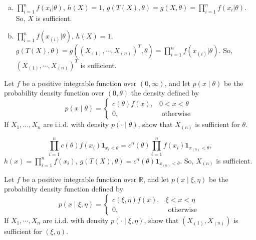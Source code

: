 \begin{solution}
    \begin{enumerate}[(a)]
        \item $\prod_{i=1}^nf(x_i|\theta)$, $h(X)=1$, $g(T(X), \theta)=g(X,\theta)=\prod_{i=1}^nf(x_i|\theta)$. So, $X$ is sufficient. 
        \item $\prod_{i=1}^nf(x_{(i)}|\theta)$, $h(X)=1$, $g(T(X), \theta)=g((X_{(1)}, \cdots,X_{(n)})^T,\theta)=\prod_{i=1}^nf(x_{(i)}|\theta)$. So, $(X_{(1)}, \cdots,X_{(n)})^T$ is sufficient. 
    \end{enumerate}
\end{solution}

\begin{exercise}
    Let \(f\) be a positive integrable function over \((0, \infty)\), and let \(p(x \mid \theta)\) be the probability density function over \((0, \theta)\) the density defined by
    \[
        p(x \mid \theta)=\left\{\begin{array}{cl}
        c(\theta) f(x), & 0<x<\theta \\
        0, & \text { otherwise }
        \end{array}\right.
    \]
    If \(X_{1}, \ldots, X_{n}\) are i.i.d. with density \(p(\cdot \mid \theta)\), show that \(X_{(n)}\) is sufficient for \(\theta\). 
\end{exercise}

\begin{solution}
    \[
        \prod_{i=1}^n c(\theta)f(x_i)\mathbf{1}_{x_i<\theta}=c^n(\theta)\prod_{i=1}^nf(x_i)\mathbf{1}_{x_{(n)}<\theta}, 
    \]
    $h(x)=\prod_{i=1}^nf(x_i)$, $g(T(X),\theta)=c^n(\theta)\mathbf{1}_{x_{(n)}<\theta}$. So, $X_{(n)}$ is sufficient. 
\end{solution}

\begin{exercise}
    Let \(f\) be a positive integrable function over \(\mathbb{R}\), and let \(p(x \mid \xi, \eta)\) be the probability density function defined by
    \[
        p(x \mid \xi, \eta)=\left\{\begin{array}{cl}
        c(\xi, \eta) f(x), & \xi<x<\eta \\
        0, & \text { otherwise }
        \end{array}\right.
    \]
    If \(X_{1}, \cdots, X_{n}\) are i.i.d. with density \(p(\cdot \mid \xi, \eta)\), show that \(\left(X_{(1)}, X_{(n)}\right)\) is sufficient for \((\xi, \eta)\).
\end{exercise}



